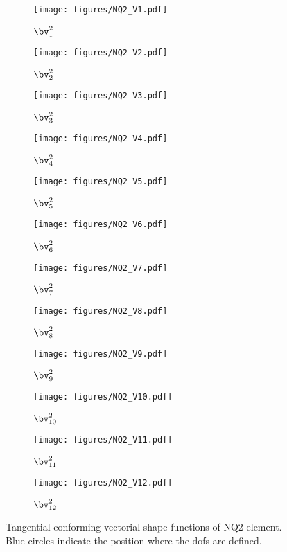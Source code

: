 \begin{figure}[ht]
     \begin{subfigure}[b]{0.32\textwidth}
         \centering
         \texttt{[image: figures/NQ2\_V1.pdf]}
        \caption{$\bv^2_1$}
     \end{subfigure}
     \begin{subfigure}[b]{0.32\textwidth}
         \centering
         \texttt{[image: figures/NQ2\_V2.pdf]}
  \caption{$\bv^2_2$}
     \end{subfigure}
          \begin{subfigure}[b]{0.32\textwidth}
         \centering
         \texttt{[image: figures/NQ2\_V3.pdf]}
  \caption{$\bv^2_3$}
     \end{subfigure}
          \begin{subfigure}[b]{0.32\textwidth}
         \centering
         \texttt{[image: figures/NQ2\_V4.pdf]}
        \caption{$\bv^2_4$}
     \end{subfigure}
       \begin{subfigure}[b]{0.32\textwidth}
         \centering
         \texttt{[image: figures/NQ2\_V5.pdf]}
        \caption{$\bv^2_5$}
     \end{subfigure}
     \begin{subfigure}[b]{0.32\textwidth}
         \centering
         \texttt{[image: figures/NQ2\_V6.pdf]}
  \caption{$\bv^2_6$}
     \end{subfigure}
          \begin{subfigure}[b]{0.32\textwidth}
         \centering
         \texttt{[image: figures/NQ2\_V7.pdf]}
  \caption{$\bv^2_7$}
     \end{subfigure}
          \begin{subfigure}[b]{0.32\textwidth}
         \centering
         \texttt{[image: figures/NQ2\_V8.pdf]}
        \caption{$\bv^2_8$}
     \end{subfigure}
        \begin{subfigure}[b]{0.32\textwidth}
         \centering
         \texttt{[image: figures/NQ2\_V9.pdf]}
        \caption{$\bv^2_9$}
     \end{subfigure}
     \begin{subfigure}[b]{0.32\textwidth}
         \centering
         \texttt{[image: figures/NQ2\_V10.pdf]}
  \caption{$\bv^2_{10}$}
     \end{subfigure}
          \begin{subfigure}[b]{0.32\textwidth}
         \centering
         \texttt{[image: figures/NQ2\_V11.pdf]}
  \caption{$\bv^2_{11}$}
     \end{subfigure}
          \begin{subfigure}[b]{0.32\textwidth}
         \centering
         \texttt{[image: figures/NQ2\_V12.pdf]}
        \caption{$\bv^2_{12}$}
     \end{subfigure}
       \caption{Tangential-conforming vectorial shape functions of NQ2 element.  Blue circles indicate the position where the dofs are defined. }
        \label{Fig:shape_function_NQ2}
\end{figure}
